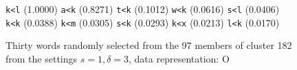 \begin{figure}[!t]
\begin{mdframed}
\begin{mdframed}
\begin{small}
\begin{tabbing}
 \texttt{k<l} \> (1.0000) \> \texttt{a<k} \> (0.8271) \> \texttt{t<k} \> (0.1012) \> \texttt{w<k} \> (0.0616) \> \texttt{s<l} \> (0.0406)\\
\texttt{k<k} \> (0.0388) \> \texttt{k<m} \> (0.0305) \> \texttt{s<k} \> (0.0293) \> \texttt{k<x} \> (0.0213) \> \texttt{l<k} \> (0.0170)
\end{tabbing}
\end{small}
\end{mdframed}
\vspace{-4pt}
\caption{Thirty words randomly selected from the 97 members of cluster 182 from the settings $s=1,\delta =3$, data representation: O}
\label{fig:cluster-182-1-3-O}
\end{mdframed}
\end{figure}

